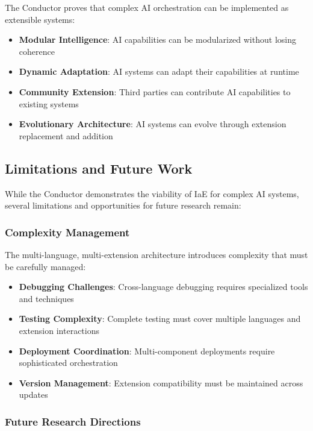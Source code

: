 The Conductor proves that complex AI orchestration can be implemented as extensible systems:

\begin{itemize}
    \item \textbf{Modular Intelligence}: AI capabilities can be modularized without losing coherence
    \item \textbf{Dynamic Adaptation}: AI systems can adapt their capabilities at runtime
    \item \textbf{Community Extension}: Third parties can contribute AI capabilities to existing systems
    \item \textbf{Evolutionary Architecture}: AI systems can evolve through extension replacement and addition
\end{itemize}

\subsection{Limitations and Future Work}

While the Conductor demonstrates the viability of IaE for complex AI systems, several limitations and opportunities for future research remain:

\subsubsection{Complexity Management}

The multi-language, multi-extension architecture introduces complexity that must be carefully managed:

\begin{itemize}
    \item \textbf{Debugging Challenges}: Cross-language debugging requires specialized tools and techniques
    \item \textbf{Testing Complexity}: Complete testing must cover multiple languages and extension interactions
    \item \textbf{Deployment Coordination}: Multi-component deployments require sophisticated orchestration
    \item \textbf{Version Management}: Extension compatibility must be maintained across updates
\end{itemize}

\subsubsection{Future Research Directions}

